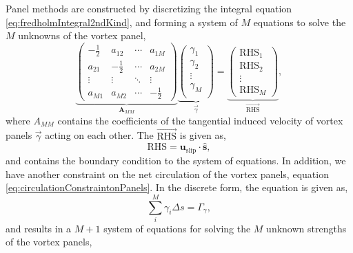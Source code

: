 Panel methods are constructed by discretizing the integral equation \ref{eq:fredholmIntegral2ndKind}, and forming a system of $M$ equations to solve the $M$ unknowns of the vortex panel,
	\begin{equation}
	\underbrace{\begin{pmatrix}
	-\frac{1}{2} & a_{12} & \cdots & a_{1M}\\ 
	a_{21} & -\frac{1}{2} & \cdots & a_{2M}\\
	\vdots & \vdots & \ddots & \vdots\\ 
	a_{M1} & a_{M2} & \cdots & -\frac{1}{2}
	\end{pmatrix}}_{\mathbf{A}_{MM}} \underbrace{\begin{pmatrix}
	\gamma_{1}\\ \gamma_{2}\\
	\vdots\\
	\gamma_M\\
	\end{pmatrix}}_{\vec{\gamma}} = \underbrace{\begin{pmatrix}
	\mathrm{RHS}_1\\ 
	\mathrm{RHS}_2\\ 
	\vdots\\
	\mathrm{RHS}_M
	\end{pmatrix}}_{\overrightarrow{\mathrm{RHS}}},
	\label{eq:vortexSheetSystemofEquations}
	\end{equation}
where $A_{MM}$ contains the coefficients of the tangential induced velocity of vortex panels $\vec{\gamma}$ acting on each other. The $\overrightarrow{\mathrm{RHS}}$ is given as,
	\begin{equation}
	\mathrm{RHS} = \mathbf{u}_{\mathrm{slip}}\cdot\mathbf{\hat{s}},
	\end{equation}
and contains the boundary condition to the system of equations. In addition, we have another constraint on the net circulation of the vortex panels, equation \ref{eq:circulationConstraintonPanels}. In the discrete form, the equation is given as,
	\begin{equation}
	\sum_{i}^{M} \gamma_i\Delta s = \Gamma_{\gamma},
	\end{equation}	
and results in a $M+1$ system of equations for solving the $M$ unknown strengths of the vortex panels,

